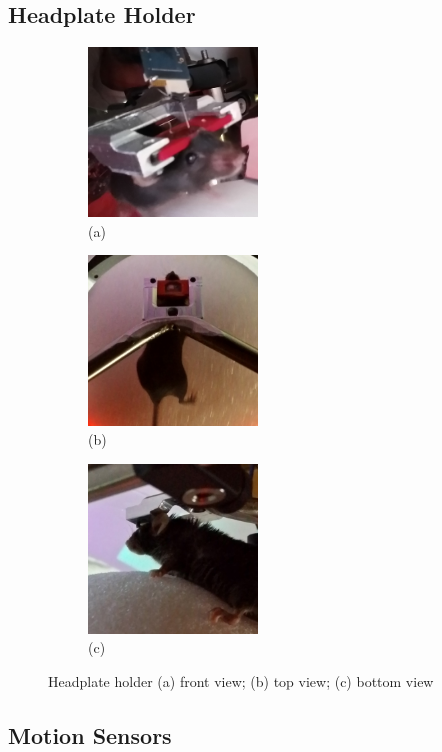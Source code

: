 \subsection{Headplate Holder}\label{sec:headplate-holder}

\begin{figure}[htb]
	\begin{subfigure}[t]{0.32\linewidth}\centering
      \includegraphics[width=4.5cm]{figures/photo-front.jpg}
      \caption{(a)}
	\end{subfigure}
	\hfill
	\begin{subfigure}[t]{0.32\linewidth}\centering
      \includegraphics[width=4.5cm]{figures/photo-top.jpg}
      \caption{(b)}
	\end{subfigure}
	\begin{subfigure}[t]{0.32\linewidth}\centering
      \includegraphics[width=4.5cm]{figures/photo-bottom.jpg}
      \caption{(c)}
	\end{subfigure}
	\caption{Headplate holder (a) front view;
		(b) top view; (c) bottom view}
	\label{fig:headplate-holder}
\end{figure}

\subsection{Motion Sensors}\label{sec:motion-sensors}

